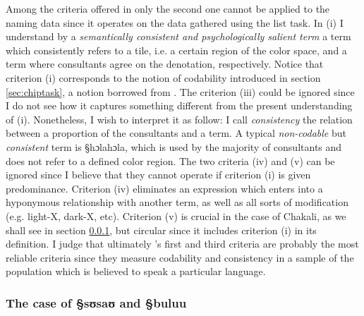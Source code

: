 Among the criteria offered in \citet[30]{Uusk08} only the second one cannot be
applied to the naming data since it operates on the data gathered using the list
task. In (i)  I  understand by a \textit{semantically consistent and
psychologically salient term}  a term which consistently refers to a tile, i.e. 
a certain region of the color space, and a term where consultants agree on the
denotation, respectively. Notice that criterion   (i) 
corresponds to the
notion of codability introduced in section \ref{sec:chiptask}, a notion  
borrowed from \citet[345]{Lenn67}.   The criterion (iii) could be ignored since
 I  do not see how it captures something different from the present 
understanding of (i).
Nonetheless, I wish to interpret it as follow: I call {\it consistency} the
relation between a  proportion of the consultants and a term. A typical {\it
non-codable} but {\it consistent} term is   {\S hɔlahɔla}, which is used  by
the majority of consultants and does not refer to a defined color region. 
The two criteria (iv) and (v) can  be ignored since I believe that they cannot
operate if criterion (i) is given predominance. Criterion (iv) eliminates an
expression which enters into a hyponymous relationship with another term, as
well as all sorts of modification (e.g. light-X, dark-X, etc). 
Criterion (v)
is crucial in the case of Chakali, as we shall see in section
\ref{sec:yellowblue}, but circular since it includes criterion (i) in its
definition. I  judge that ultimately \citeauthor{Uusk08}'s first and third
criteria are probably the most reliable criteria since they  measure
codability and consistency in a sample of the population which is believed to
speak a particular language. 



\subsubsection{The case of {\S sʊsaʊ} and {\S buluu}}
\label{sec:yellowblue}

